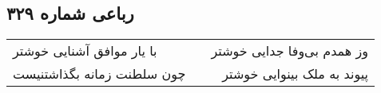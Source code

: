 \begin{center}
\section*{رباعی شماره ۳۲۹}
\label{sec:sh329}
\begin{longtable}{l p{0.5cm} r}
با یار موافق آشنایی خوشتر
&&
وز همدم بی‌وفا جدایی خوشتر
\\
چون سلطنت زمانه بگذاشتنیست
&&
پیوند به ملک بینوایی خوشتر
\\
\end{longtable}
\end{center}
